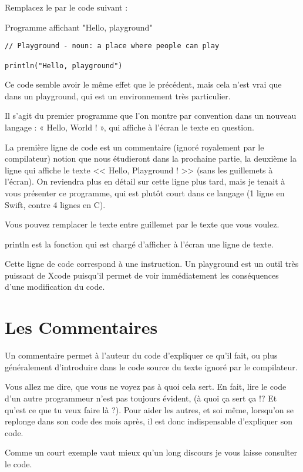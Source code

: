 Remplacez le par le code suivant :
\begin{listing}[h]
\caption{Programme affichant "Hello, playground"}
\begin{verbatim}
// Playground - noun: a place where people can play

println("Hello, playground")
\end{verbatim}
\end{listing}

Ce code semble avoir le même effet que le précédent, mais cela n'est vrai que dans un playground, qui est un environnement très particulier.

Il s’agit du premier programme que l’on montre par convention dans un nouveau langage :
« Hello, World ! », qui affiche à l’écran le texte en question.

La première ligne de code est un commentaire (ignoré royalement par le compilateur)
notion que nous étudieront dans la prochaine partie, la deuxième la ligne qui affiche le
texte << Hello, Playground ! >> (sans les guillemets à l’écran).
On reviendra plus en détail sur cette ligne plus tard, mais je tenait à vous présenter ce
programme, qui est plutôt court dans ce langage (1 ligne en Swift, contre 4 lignes en C).

Vous pouvez remplacer le texte entre guillemet par le texte que vous voulez.

println est la fonction qui est chargé d’afficher à l’écran une ligne de texte.

Cette ligne de code correspond à une instruction.
Un playground est un outil très puissant de Xcode puisqu’il permet de voir immédiatement
les conséquences d’une modification du code.
\section{Les Commentaires}
Un commentaire permet à l’auteur du code d’expliquer ce qu’il fait, ou plus généralement
d’introduire dans le code source du texte ignoré par le compilateur.

Vous allez me dire, que vous ne voyez pas à quoi cela sert. En fait, lire le code d’un autre
programmeur n’est pas toujours évident, (à quoi ça sert ça !? Et qu’est ce que tu veux faire
là ?). Pour aider les autres, et soi même, lorsqu’on se replonge dans son code des mois après, il est donc
indispensable d’expliquer son code.

Comme un court exemple vaut mieux qu’un long discours je vous laisse consulter le code.

